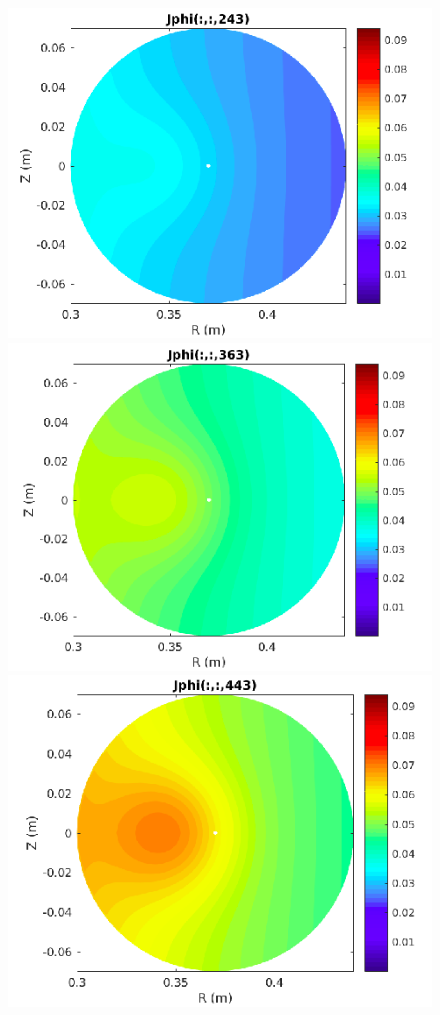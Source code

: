 \documentclass[12pt,oneside,a4paper]{abntex2}
\begin{document}
\begin{figure}[H]
\includegraphics[scale=0.4]{../SImulacao_breakdown/Adaptacao_nova/explicito/j243.png} 
\includegraphics[scale=0.4]{../SImulacao_breakdown/Adaptacao_nova/explicito/j363.png} 
\includegraphics[scale=0.4]{../SImulacao_breakdown/Adaptacao_nova/explicito/j443.png} 

\end{figure}
\end{document}
